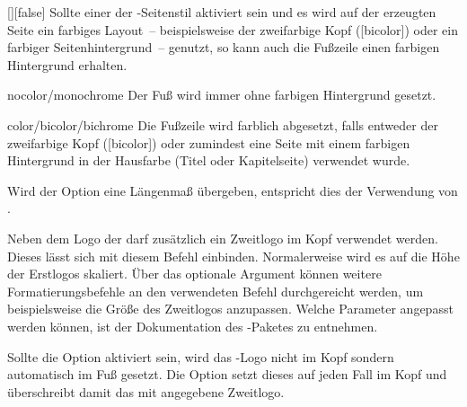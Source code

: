 \begin{Declaration*}{}
\begin{Declaration*}{}
\begin{Declaration*}{}
\begin{Declaration}{[\PSet]}[false]
Sollte einer der -Seitenstil aktiviert sein und es wird 
auf der erzeugten Seite ein farbiges Layout~--  beispielsweise der zweifarbige 
Kopf ([bicolor]) oder ein farbiger Seitenhintergrund~-- genutzt, 
so kann auch die Fußzeile einen farbigen Hintergrund erhalten.
%
\begin{values}
\item[nocolor/monochrome]
  Der Fuß wird immer ohne farbigen Hintergrund gesetzt.
\item[color/bicolor/bichrome]
  Die Fußzeile wird farblich abgesetzt, falls entweder der zweifarbige Kopf
  ([bicolor]) oder zumindest eine Seite mit einem farbigen 
  Hintergrund in der Hausfarbe (Titel oder Kapitelseite) verwendet wurde.
\end{values}
%
Wird der Option  eine Längenmaß übergeben, entspricht dies der 
Verwendung von .
\end{Declaration}

\begin{Declaration}{\LParameter{}}
\printdeclarationlist%
%
%
%
%
Neben dem Logo der \TnUD darf zusätzlich ein Zweitlogo im Kopf verwendet 
werden. Dieses lässt sich mit diesem Befehl einbinden. Normalerweise wird es 
auf die Höhe der Erstlogos skaliert. Über das optionale Argument können weitere 
Formatierungsbefehle an den verwendeten Befehl  
durchgereicht werden, um beispielsweise die Größe des Zweitlogos anzupassen.
Welche Parameter angepasst werden können, ist der Dokumentation des
-Paketes zu entnehmen.

Sollte die Option  aktiviert sein, wird das \DDC-Logo nicht im Kopf 
sondern automatisch im Fuß gesetzt. Die Option  setzt dieses 
auf jeden Fall im Kopf und überschreibt damit das mit  
angegebene Zweitlogo.
\end{Declaration}

\begin{Declaration}[v2.03]{%
  \LParameter{}%
}
\begin{Declaration}[v2.03]{}%
\begin{Declaration}[v2.03]{}%
\printdeclarationlist%
%
%
%


\end{Declaration}
\end{Declaration}
\end{Declaration}
\end{Declaration*}
\end{Declaration*}
\end{Declaration*}
